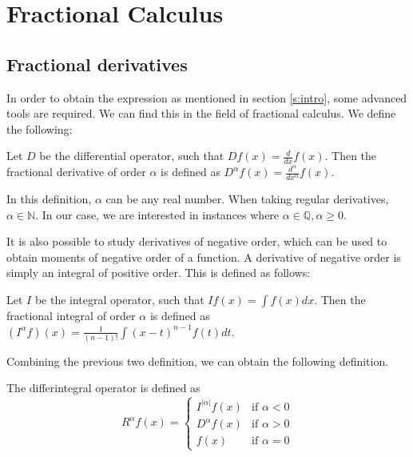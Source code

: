 \section{Fractional Calculus}\label{s:calculus}
\subsection{Fractional derivatives}
In order to obtain the expression as mentioned in section \autoref{s:intro}, some advanced tools are required. We can find this in the field of fractional calculus.
We define the following:
\begin{definition}
    Let \(D\) be the differential operator, such that \(D f(x) = \frac{d}{dx} f(x)\). Then the fractional derivative of order \(\alpha\) is defined as \(D^{\alpha} f(x) = \frac{d^{\alpha}}{dx^{\alpha}} f(x)\).
\end{definition}
In this definition, \(\alpha\) can be any real number. When taking regular derivatives, \(\alpha \in \mathbb{N}\). In our case, we are interested in instances where  \(\alpha \in \mathbb{Q}, \alpha \geq 0\).

It is also possible to study derivatives of negative order, which can be used to obtain moments of negative order of a function. A derivative of negative order is simply an integral of positive order. This is defined as follows:
\begin{definition}
    Let \(I\) be the integral operator, such that \(I f(x) = \int f(x) dx\). Then the fractional integral of order \(\alpha\) is defined as \((I^{\alpha} f) (x) = \frac{1}{(n-1)!}\int (x-t)^{n-1} f(t) dt\).
\end{definition}

Combining the previous two definition, we can obtain the following definition.
\begin{definition}\label{d: differintegral}
    The differintegral operator is defined as
    \begin{equation}
        R^\alpha f(x) = \begin{cases}
            I^{|\alpha|} f(x) & \text{if } \alpha < 0 \\
            D^\alpha f(x) & \text{if } \alpha > 0 \\
            f(x) & \text{if } \alpha = 0
        \end{cases}
        \end{equation}
\end{definition}

